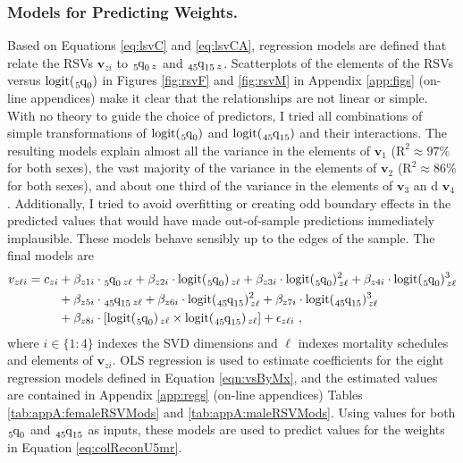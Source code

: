 \documentclass[11pt]{article}
\newcommand{\mbf}{\mathbf}
\newcommand{\qf}{\tensor*[_5]{\mbox{q}}{_0}}
\newcommand{\qff}{\tensor*[_{45}]{\mbox{q}}{_{15}}}
\newcommand{\logit}{\mbox{logit}}
\begin{document}
\subsubsection{Models for Predicting Weights. \label{sec:modsPredWeights}} 

Based on Equations \ref{eq:lsvC} and \ref{eq:lsvCA}, regression models are defined that relate the RSVs $\mbf{v}_{zi}$ to $\qf_{\, z}$ and $\qff_{\, z}$.  Scatterplots of the elements of the RSVs versus $\logit(\qf)$ in Figures \ref{fig:rsvF} and \ref{fig:rsvM} in Appendix \ref{app:figs} (on-line appendices) make it clear that the relationships are not linear or simple.  With no theory to guide the choice of predictors, I tried all combinations of simple transformations of $\logit(\qf)$ and $\logit(\qff)$ and their interactions.  The resulting models explain almost all the variance in the elements of $\mbf{v}_1$ ($\mbox{R}^2 \approx 97\%$ for both sexes), the vast majority of the variance in the elements of $\mbf{v}_2$ ($\mbox{R}^2 \approx 86\%$ for both sexes), and about one third of the variance in the elements of $\mbf{v}_3$ an d $\mbf{v}_4$.  Additionally, I tried to avoid overfitting or creating odd boundary effects in the predicted values that would have made out-of-sample predictions immediately implausible.  These models behave sensibly up to the edges of the sample. The final models are %
%
\begin{align}
v_{z \ell i} = c_{zi} &+  \beta_{z1i} \cdot \qf_{\, z\ell} + \beta_{z2i} \cdot \logit(\qf)_{\, z\ell} + \beta_{z3i} \cdot \logit(\qf)^2_{\, z\ell} + \beta_{z4i} \cdot \logit(\qf)^3_{\, z\ell} \nonumber \\  
 &+ \beta_{z5i} \cdot \qff_{\, z\ell} + \beta_{z6i} \cdot \logit(\qff)^2_{\, z\ell} +  \beta_{z7i} \cdot \logit(\qff)^3_{\, z\ell} \nonumber \\ 
 &+ \beta_{z8i} \cdot [\logit(\qf)_{\, z\ell} \times \logit(\qff)_{\, z\ell}] + \epsilon_{z\ell i} \ , \label{eqn:vsByMx} 
\end{align}%
%
where $i \in \{1:4\}$ indexes the SVD dimensions and $\ell$ indexes mortality schedules and elements of $\mbf{v}_{zi}$.  OLS regression is used to estimate coefficients for the eight regression models defined in Equation \ref{eqn:vsByMx}, and the estimated values are contained in Appendix \ref{app:regs} (on-line appendices) Tables \ref{tab:appA:femaleRSVMods} and \ref{tab:appA:maleRSVMods}.  Using  values for both $\qf$ and $\qff$ as inputs, these models are used to predict values for the weights in Equation \ref{eq:colReconU5mr}.  
\end{document}
